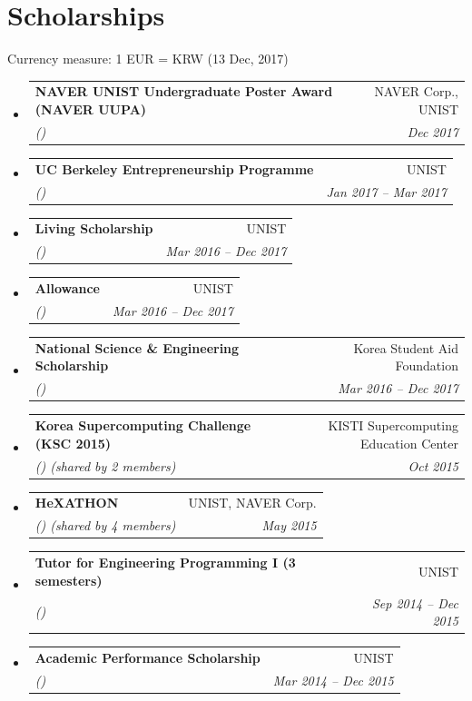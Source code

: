 \documentclass[letterpaper,11pt]{article}
\makeatletter
\def \symbolcurrency {\textdollar}
\def \textcurrency {USD}
\def \rateWonCurrency {1127.00}
\def \dateCurrency {(Oct 17, 2018)}
\def \symbolcurrency {\textdollar}
\def \textcurrency {CAD}
\def \rateWonCurrency {845.18}
\def \dateCurrency {(Dec 7, 2018)}
\def \symbolcurrency {\textsterling}
\def \textcurrency {GBP}
\def \rateWonCurrency {1477.38}
\def \dateCurrency {(17 Oct, 2018)}
\def \symbolcurrency {\texteuro}
\def \textcurrency {EUR}
\def \rateWonCurrency {1282.47}
\def \dateCurrency {(13 Dec, 2017)}
\newcommand{\resumeSubheading}[4]{
  \vspace{-1pt}\item
    \begin{tabular*}{0.97\textwidth}{l@{\extracolsep{\fill}}r}
      \textbf{#1} & #2 \\
      \textit{\small#3} & \textit{\small #4} \\
    \end{tabular*}\vspace{-5pt}
}
\newcommand{\resumeSubHeadingListStart}{\begin{itemize}[leftmargin=*]}
\newcommand{\resumeSubHeadingListEnd}{\end{itemize}}
\makeatother
\begin{document}

\newcommand{\calcCurrencyPrice}[2]{\FPeval{#2}{round(#1 / \rateWonCurrency,0)}} %
\newcommand{\setWonPrice}[1]{\def\wonprice{#1}\calcCurrencyPrice{\wonprice}{\currencyprice}}   %
\def \currencyWonPrint{\textwon\numprint{\wonprice} (\symbolcurrency\numprint{\currencyprice})}

\section{Scholarships}
Currency measure: 1 \textcurrency{} = \numprint{\rateWonCurrency} KRW \dateCurrency{}
  \resumeSubHeadingListStart
    \resumeSubheading
      {NAVER UNIST Undergraduate Poster Award (NAVER UUPA)}{NAVER Corp., UNIST}
      {\setWonPrice{2500000}\currencyWonPrint}{Dec 2017}
    \resumeSubheading
      {UC Berkeley Entrepreneurship Programme}{UNIST}
      {\setWonPrice{9975200}\currencyWonPrint}{Jan 2017 -- Mar 2017}
    \resumeSubheading
      {Living Scholarship}{UNIST}
      {\setWonPrice{2140000}\currencyWonPrint}{Mar 2016 -- Dec 2017}
    \resumeSubheading
      {Allowance}{UNIST}
      {\setWonPrice{2517600}\currencyWonPrint}{Mar 2016 -- Dec 2017}
    \resumeSubheading
      {National Science \& Engineering Scholarship}{Korea Student Aid Foundation}
      {\setWonPrice{12588000}\currencyWonPrint}{Mar 2016 -- Dec 2017}
    \resumeSubheading
      {Korea Supercomputing Challenge (KSC 2015)}{KISTI Supercomputing Education Center}
      {\setWonPrice{500000}\currencyWonPrint{} (shared by 2 members)}{Oct 2015}
    \resumeSubheading
      {HeXATHON}{UNIST, NAVER Corp.}
      {\setWonPrice{1500000}\currencyWonPrint{} (shared by 4 members)}{May 2015}
    \resumeSubheading
      {Tutor for Engineering Programming I (3 semesters)}{UNIST}
      {\setWonPrice{1200000}\currencyWonPrint}{Sep 2014 -- Dec 2015}
    \resumeSubheading
      {Academic Performance Scholarship}{UNIST}
      {\setWonPrice{12660000}\currencyWonPrint}{Mar 2014 -- Dec 2015}
  \resumeSubHeadingListEnd
\end{document}
